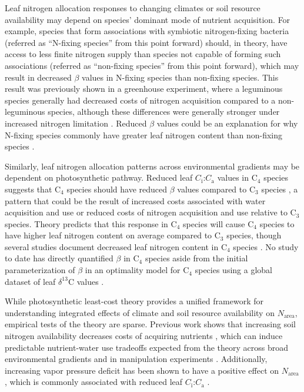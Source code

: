 Leaf nitrogen allocation responses to changing climates or soil resource availability may depend on species' dominant mode of nutrient acquisition. For example, species that form associations with symbiotic nitrogen-fixing bacteria (referred as “N-fixing species” from this point forward) should, in theory, have access to less finite nitrogen supply than species not capable of forming such associations (referred as “non-fixing species” from this point forward), which may result in decreased $\beta$ values in N-fixing species than non-fixing species. This result was previously shown in a greenhouse experiment, where a leguminous species generally had decreased costs of nitrogen acquisition compared to a non-leguminous species, although these differences were generally stronger under increased nitrogen limitation . Reduced $\beta$ values could be an explanation for why N-fixing species commonly have greater leaf nitrogen content than non-fixing species .

Similarly, leaf nitrogen allocation patterns across environmental gradients may be dependent on photosynthetic pathway. Reduced leaf $C_\mathrm{i}$:$C_\mathrm{a}$ values in C$_4$ species suggests that C$_4$ species should have reduced $\beta$ values compared to C$_3$ species , a pattern that could be the result of increased costs associated with water acquisition and use or reduced costs of nitrogen acquisition and use relative to C$_3$ species. Theory predicts that this response in C$_4$ species will cause C$_4$ species to have higher leaf nitrogen content on average compared to C$_3$ species, though several studies document decreased leaf nitrogen content in C$_4$ species . No study to date has directly quantified $\beta$ in C$_4$ species aside from the initial parameterization of $\beta$ in an optimality model for C$_4$ species  using a global dataset of leaf $\delta^{13}$C values .

While photosynthetic least-cost theory provides a unified framework for understanding integrated effects of climate and soil resource availability on $N_\mathrm{area}$, empirical tests of the theory are sparse. Previous work shows that increasing soil nitrogen availability decreases costs of acquiring nutrients , which can induce predictable nutrient-water use tradeoffs expected from the theory across broad environmental gradients  and in manipulation experiments . Additionally, increasing vapor pressure deficit has been shown to have a positive effect on $N_\mathrm{area}$, which is commonly associated with reduced leaf $C_\mathrm{i}$:$C_\mathrm{a}$ .

